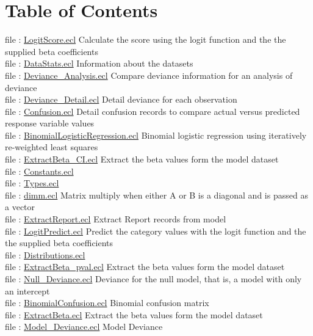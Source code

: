 \section*{Table of Contents}
file : \hyperlink{ecldoc:toc:LogisticRegression.LogitScore}{LogitScore.ecl}  Calculate the score using the logit function and the the supplied beta coefficients \\
file : \hyperlink{ecldoc:toc:LogisticRegression.DataStats}{DataStats.ecl}  Information about the datasets \\
file : \hyperlink{ecldoc:toc:LogisticRegression.Deviance_Analysis}{Deviance\_Analysis.ecl}  Compare deviance information for an analysis of deviance \\
file : \hyperlink{ecldoc:toc:LogisticRegression.Deviance_Detail}{Deviance\_Detail.ecl}  Detail deviance for each observation \\
file : \hyperlink{ecldoc:toc:LogisticRegression.Confusion}{Confusion.ecl}  Detail confusion records to compare actual versus predicted response variable values \\
file : \hyperlink{ecldoc:toc:LogisticRegression.BinomialLogisticRegression}{BinomialLogisticRegression.ecl}  Binomial logistic regression using iteratively re-weighted least squares \\
file : \hyperlink{ecldoc:toc:LogisticRegression.ExtractBeta_CI}{ExtractBeta\_CI.ecl}  Extract the beta values form the model dataset \\
file : \hyperlink{ecldoc:toc:LogisticRegression.Constants}{Constants.ecl}   \\
file : \hyperlink{ecldoc:toc:LogisticRegression.Types}{Types.ecl}   \\
file : \hyperlink{ecldoc:toc:LogisticRegression.dimm}{dimm.ecl}  Matrix multiply when either A or B is a diagonal and is passed as a vector \\
file : \hyperlink{ecldoc:toc:LogisticRegression.ExtractReport}{ExtractReport.ecl}  Extract Report records from model \\
file : \hyperlink{ecldoc:toc:LogisticRegression.LogitPredict}{LogitPredict.ecl}  Predict the category values with the logit function and the the supplied beta coefficients \\
file : \hyperlink{ecldoc:toc:LogisticRegression.Distributions}{Distributions.ecl}   \\
file : \hyperlink{ecldoc:toc:LogisticRegression.ExtractBeta_pval}{ExtractBeta\_pval.ecl}  Extract the beta values form the model dataset \\
file : \hyperlink{ecldoc:toc:LogisticRegression.Null_Deviance}{Null\_Deviance.ecl}  Deviance for the null model, that is, a model with only an intercept \\
file : \hyperlink{ecldoc:toc:LogisticRegression.BinomialConfusion}{BinomialConfusion.ecl}  Binomial confusion matrix \\
file : \hyperlink{ecldoc:toc:LogisticRegression.ExtractBeta}{ExtractBeta.ecl}  Extract the beta values form the model dataset \\
file : \hyperlink{ecldoc:toc:LogisticRegression.Model_Deviance}{Model\_Deviance.ecl}  Model Deviance \\

